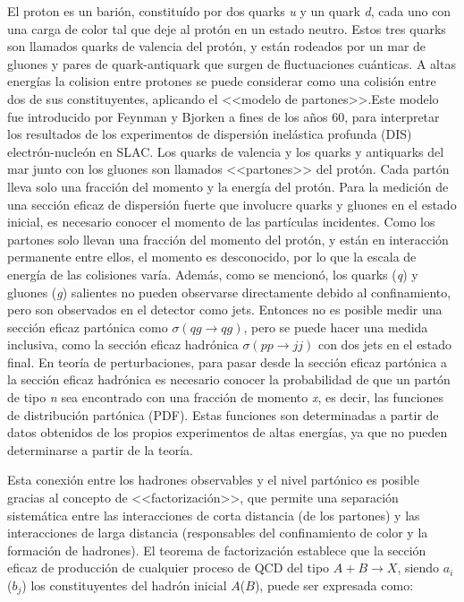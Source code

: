 El proton es un barión, constituído por dos quarks \textit{u} y un quark \textit{d}, cada uno con una carga de color tal que deje al protón en un estado neutro. Estos tres quarks son llamados quarks de valencia del protón, y están rodeados por un mar de gluones y pares de quark-antiquark que surgen de fluctuaciones cuánticas. A altas energías la colision entre protones se puede considerar como una colisión entre dos de sus constituyentes, aplicando el <<modelo de partones>>.Este modelo fue introducido por Feynman \cite{PhysRevLett.23.1415} y Bjorken \cite{PhysRev.185.1975} a fines de los años 60, para interpretar los resultados de los experimentos de dispersión inelástica profunda (DIS) electrón-nucleón en SLAC. Los quarks de valencia y los quarks y antiquarks del mar junto con los gluones son llamados <<partones>> del protón. Cada partón lleva solo una fracción del momento y la energía del protón. Para la medición de una sección eficaz de dispersión fuerte que involucre quarks y gluones en el estado inicial, es necesario conocer el momento de las partículas incidentes. Como los partones solo llevan una fracción del momento del protón, y están en interacción permanente entre ellos, el momento es desconocido, por lo que la escala de energía de las colisiones varía. Además, como se mencionó, los quarks (\textit{q}) y gluones (\textit{g}) salientes no pueden observarse directamente debido al confinamiento, pero son observados en el detector como jets. Entonces no es posible medir una sección eficaz partónica como $\sigma(qg \rightarrow qg)$, pero se puede hacer una medida inclusiva, como la sección eficaz hadrónica $\sigma(pp \rightarrow jj)$ con dos jets en el estado final. En teoría de perturbaciones, para pasar desde la sección eficaz partónica a la sección eficaz hadrónica es necesario conocer la probabilidad de que un partón de tipo \textit{n} sea encontrado con una fracción de momento \textit{x}, es decir, las funciones de distribución partónica (PDF). Estas funciones son determinadas a partir de datos obtenidos de los propios experimentos de altas energías, ya que no pueden determinarse a partir de la teoría. 

Esta conexión entre los hadrones observables y el nivel partónico es posible gracias al concepto de <<factorización>>, que permite una separación sistemática entre las interacciones de corta distancia (de los partones) y las interacciones de larga distancia (responsables del confinamiento de color y la formación de hadrones). El teorema de factorización \cite{ELLIS1978281} establece que la sección eficaz de producción de cualquier proceso de QCD del tipo $A + B \rightarrow X$, siendo $a_{i}$ ($b_{j}$) los constituyentes del hadrón inicial $A$($B$), puede ser expresada como: 

